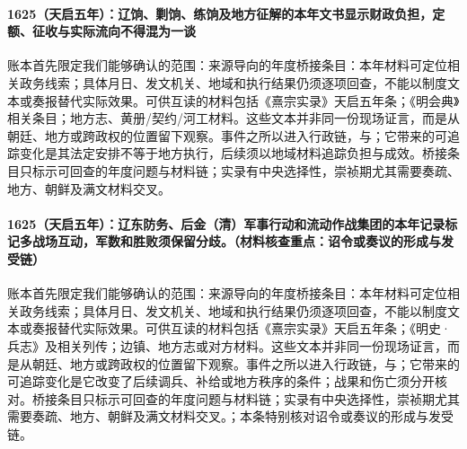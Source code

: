 \paragraph{1625（天启五年）：辽饷、剿饷、练饷及地方征解的本年文书显示财政负担，定额、征收与实际流向不得混为一谈} 账本首先限定我们能够确认的范围：来源导向的年度桥接条目：本年材料可定位相关政务线索；具体月日、发文机关、地域和执行结果仍须逐项回查，不能以制度文本或奏报替代实际效果。可供互读的材料包括《熹宗实录》天启五年条；《明会典》相关条目；地方志、黄册/契约/河工材料。这些文本并非同一份现场证言，而是从朝廷、地方或跨政权的位置留下观察。事件之所以进入行政链，与；它带来的可追踪变化是其法定安排不等于地方执行，后续须以地域材料追踪负担与成效。桥接条目只标示可回查的年度问题与材料链；实录有中央选择性，崇祯期尤其需要奏疏、地方、朝鲜及满文材料交叉。

\paragraph{1625（天启五年）：辽东防务、后金（清）军事行动和流动作战集团的本年记录标记多战场互动，军数和胜败须保留分歧。（材料核查重点：诏令或奏议的形成与发受链）} 账本首先限定我们能够确认的范围：来源导向的年度桥接条目：本年材料可定位相关政务线索；具体月日、发文机关、地域和执行结果仍须逐项回查，不能以制度文本或奏报替代实际效果。可供互读的材料包括《熹宗实录》天启五年条；《明史·兵志》及相关列传；边镇、地方志或对方材料。这些文本并非同一份现场证言，而是从朝廷、地方或跨政权的位置留下观察。事件之所以进入行政链，与；它带来的可追踪变化是它改变了后续调兵、补给或地方秩序的条件；战果和伤亡须分开核对。桥接条目只标示可回查的年度问题与材料链；实录有中央选择性，崇祯期尤其需要奏疏、地方、朝鲜及满文材料交叉。；本条特别核对诏令或奏议的形成与发受链。
